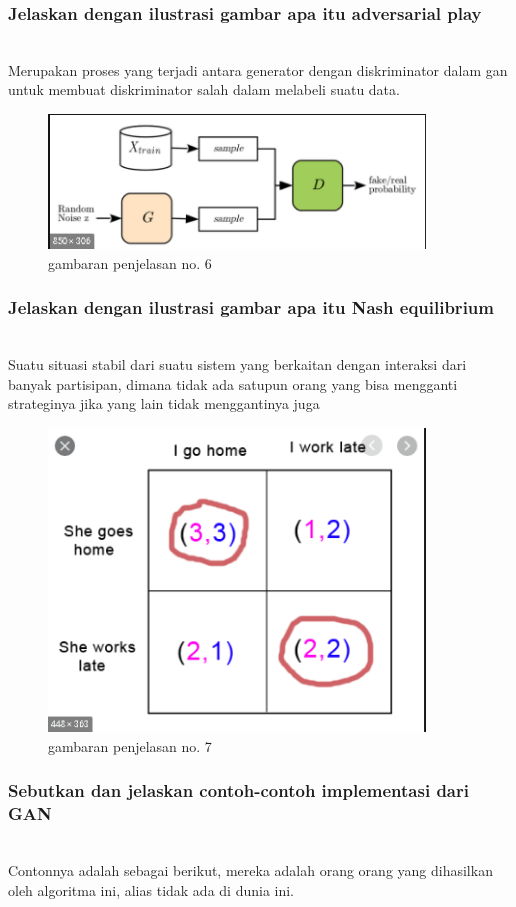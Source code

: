 \subsubsection{Jelaskan dengan ilustrasi gambar apa itu adversarial play}
\hfill\\
Merupakan proses yang terjadi antara generator dengan diskriminator dalam gan untuk membuat diskriminator salah dalam melabeli suatu data.
\begin{figure}[H]
	\centering
	\includegraphics[width=10cm]{figures/1174079/8/adversarialplay.png}
	\caption{gambaran penjelasan no. 6}
\end{figure}

\subsubsection{Jelaskan dengan ilustrasi gambar apa itu Nash equilibrium}
\hfill\\
Suatu situasi stabil dari suatu sistem yang berkaitan dengan interaksi dari banyak partisipan, dimana tidak ada satupun orang yang bisa mengganti strateginya jika yang lain tidak menggantinya juga
\begin{figure}[H]
	\centering
	\includegraphics[width=10cm]{figures/1174079/8/nash.png}
	\caption{gambaran penjelasan no. 7}
\end{figure}

\subsubsection{Sebutkan dan jelaskan contoh-contoh implementasi dari GAN}
\hfill\\
Contonnya adalah sebagai berikut, mereka adalah orang orang yang dihasilkan oleh algoritma ini, alias tidak ada di dunia ini.


